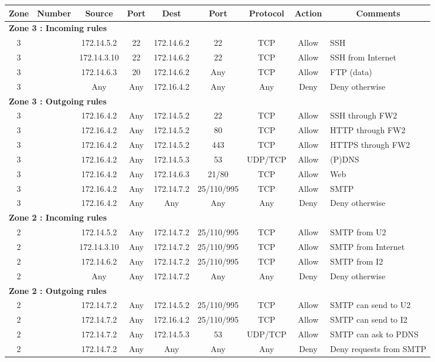 \documentclass[a4paper,titlepage]{article}
\begin{document}
\begin{landscape}
	\begin{table}[h]
		\centering
		\begin{tabular}{c|c|cc|cc|ccl}
			Zone & Number & Source & Port & Dest & Port & Protocol & Action & \multicolumn{1}{c}{Comments}\\
			\hline
			\multicolumn{9}{l}{\textbf{Zone 3 : Incoming rules}}\\
			3 &  & 172.14.5.2 & 22 & 172.14.6.2 & 22 & TCP & Allow & SSH\\
			3 &  & 172.14.3.10 & 22 & 172.14.6.2 & 22 & TCP & Allow & SSH from Internet\\
			3 &  & 172.14.6.3 & 20 & 172.14.6.2 & Any & TCP & Allow & FTP (data)\\
			3 &  & Any & Any & 172.16.4.2 & Any & Any & Deny & Deny otherwise\\

			\hline
			\multicolumn{9}{l}{\textbf{Zone 3 : Outgoing rules}}\\
			3 &  & 172.16.4.2 & Any & 172.14.5.2 & 22 & TCP & Allow & SSH through FW2\\
			3 &  & 172.16.4.2 & Any & 172.14.5.2 & 80 & TCP & Allow & HTTP through FW2\\
			3 &  & 172.16.4.2 & Any & 172.14.5.2 & 443 & TCP & Allow & HTTPS through FW2\\
			3 &  & 172.16.4.2 & Any & 172.14.5.3 & 53 & UDP/TCP & Allow & (P)DNS\\
			3 &  & 172.16.4.2 & Any & 172.14.6.3 & 21/80 & TCP & Allow & Web\\
			3 &  & 172.16.4.2 & Any & 172.14.7.2 & 25/110/995 & TCP & Allow & SMTP\\
			3 &  & 172.16.4.2 & Any & Any & Any & Any & Deny & Deny otherwise\\

			\hline
			\multicolumn{9}{l}{\textbf{Zone 2 : Incoming rules}}\\
			2 &  & 172.14.5.2 & Any & 172.14.7.2 & 25/110/995 & TCP & Allow & SMTP from U2\\
			2 &  & 172.14.3.10 & Any & 172.14.7.2 & 25/110/995 & TCP & Allow & SMTP from Internet\\
			2 &  & 172.14.6.2 & Any & 172.14.7.2 & 25/110/995 & TCP & Allow & SMTP from I2\\
			2 &  & Any & Any & 172.14.7.2 & Any & Any & Deny & Deny otherwise\\

			\hline
			\multicolumn{9}{l}{\textbf{Zone 2 : Outgoing rules}}\\
			2 &  & 172.14.7.2 & Any & 172.14.5.2 & 25/110/995 & TCP & Allow & SMTP can send to U2\\
			2 &  & 172.14.7.2 & Any & 172.16.4.2 & 25/110/995 & TCP & Allow & SMTP can send to I2\\
			2 &  & 172.14.7.2 & Any & 172.14.5.3 & 53 & UDP/TCP & Allow & SMTP can ask to PDNS\\
			2 &  & 172.14.7.2 & Any & Any & Any & Any & Deny & Deny requests from SMTP\\


\end{tabular}
\end{table}
\end{landscape}
\end{document}
